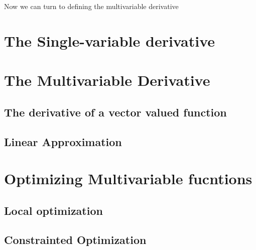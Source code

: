 Now we can turn to defining the multivariable derivative

\section{The Single-variable derivative}

\section{The Multivariable Derivative}

\subsection{The derivative of a vector valued function}

\subsection{Linear Approximation}

\section{Optimizing Multivariable fucntions}

\subsection{Local optimization}

\subsection{Constrainted Optimization}